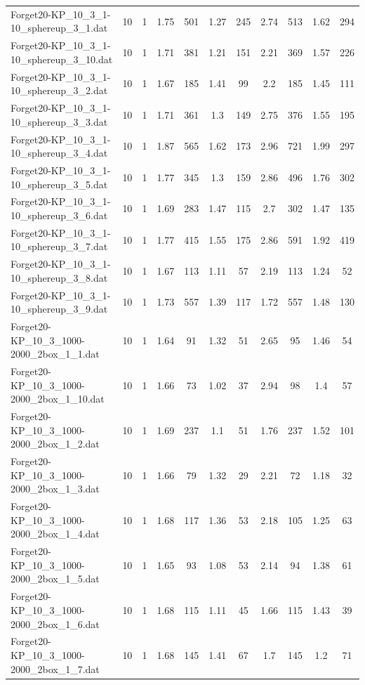 \begin{table}[!ht]
\begin{tabular}{lcccccccccc}
Forget20-KP\_10\_3\_1-10\_sphereup\_3\_1.dat & 10 & 1 & 1.75 & 501 & 1.27 & 245 & 2.74 & 513 & 1.62 & 294 \\
Forget20-KP\_10\_3\_1-10\_sphereup\_3\_10.dat & 10 & 1 & 1.71 & 381 & 1.21 & 151 & 2.21 & 369 & 1.57 & 226 \\
Forget20-KP\_10\_3\_1-10\_sphereup\_3\_2.dat & 10 & 1 & 1.67 & 185 & 1.41 & 99 & 2.2 & 185 & 1.45 & 111 \\
Forget20-KP\_10\_3\_1-10\_sphereup\_3\_3.dat & 10 & 1 & 1.71 & 361 & 1.3 & 149 & 2.75 & 376 & 1.55 & 195 \\
Forget20-KP\_10\_3\_1-10\_sphereup\_3\_4.dat & 10 & 1 & 1.87 & 565 & 1.62 & 173 & 2.96 & 721 & 1.99 & 297 \\
Forget20-KP\_10\_3\_1-10\_sphereup\_3\_5.dat & 10 & 1 & 1.77 & 345 & 1.3 & 159 & 2.86 & 496 & 1.76 & 302 \\
Forget20-KP\_10\_3\_1-10\_sphereup\_3\_6.dat & 10 & 1 & 1.69 & 283 & 1.47 & 115 & 2.7 & 302 & 1.47 & 135 \\
Forget20-KP\_10\_3\_1-10\_sphereup\_3\_7.dat & 10 & 1 & 1.77 & 415 & 1.55 & 175 & 2.86 & 591 & 1.92 & 419 \\
Forget20-KP\_10\_3\_1-10\_sphereup\_3\_8.dat & 10 & 1 & 1.67 & 113 & 1.11 & 57 & 2.19 & 113 & 1.24 & 52 \\
Forget20-KP\_10\_3\_1-10\_sphereup\_3\_9.dat & 10 & 1 & 1.73 & 557 & 1.39 & 117 & 1.72 & 557 & 1.48 & 130 \\
Forget20-KP\_10\_3\_1000-2000\_2box\_1\_1.dat & 10 & 1 & 1.64 & 91 & 1.32 & 51 & 2.65 & 95 & 1.46 & 54 \\
Forget20-KP\_10\_3\_1000-2000\_2box\_1\_10.dat & 10 & 1 & 1.66 & 73 & 1.02 & 37 & 2.94 & 98 & 1.4 & 57 \\
Forget20-KP\_10\_3\_1000-2000\_2box\_1\_2.dat & 10 & 1 & 1.69 & 237 & 1.1 & 51 & 1.76 & 237 & 1.52 & 101 \\
Forget20-KP\_10\_3\_1000-2000\_2box\_1\_3.dat & 10 & 1 & 1.66 & 79 & 1.32 & 29 & 2.21 & 72 & 1.18 & 32 \\
Forget20-KP\_10\_3\_1000-2000\_2box\_1\_4.dat & 10 & 1 & 1.68 & 117 & 1.36 & 53 & 2.18 & 105 & 1.25 & 63 \\
Forget20-KP\_10\_3\_1000-2000\_2box\_1\_5.dat & 10 & 1 & 1.65 & 93 & 1.08 & 53 & 2.14 & 94 & 1.38 & 61 \\
Forget20-KP\_10\_3\_1000-2000\_2box\_1\_6.dat & 10 & 1 & 1.68 & 115 & 1.11 & 45 & 1.66 & 115 & 1.43 & 39 \\
Forget20-KP\_10\_3\_1000-2000\_2box\_1\_7.dat & 10 & 1 & 1.68 & 145 & 1.41 & 67 & 1.7 & 145 & 1.2 & 71 \\

\end{tabular}
\end{table}

